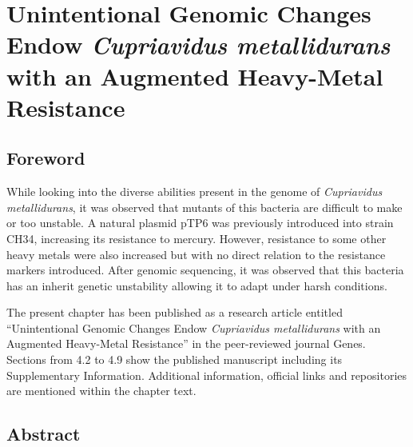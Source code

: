 \chapter{Unintentional Genomic Changes Endow \textit{Cupriavidus metallidurans} with an Augmented Heavy-Metal Resistance }

\section{Foreword}

While looking into the diverse abilities present in the genome of \textit{Cupriavidus metallidurans}, it was observed that mutants of this bacteria are difficult to make or too unstable. A natural plasmid pTP6 was previously introduced into strain CH34, increasing its resistance to mercury. However, resistance to some other heavy metals were also increased but with no direct relation to the resistance markers introduced. After genomic sequencing, it was observed that this bacteria has an inherit genetic unstability allowing it to adapt under harsh conditions. 

The present chapter has been published as a research article entitled “Unintentional Genomic Changes Endow \textit{Cupriavidus metallidurans} with an Augmented Heavy-Metal Resistance” in the peer-reviewed journal Genes. Sections from 4.2 to 4.9 show the published manuscript including its Supplementary Information. Additional information, official links and repositories are mentioned within the chapter text. 

\section{Abstract}

